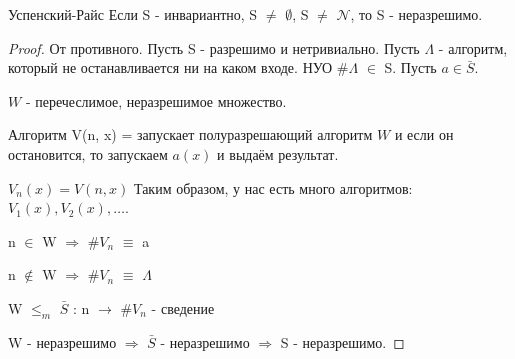 \begin{theorem}{Успенский-Райс}
	Если S - инвариантно, S $\ne$  $\emptyset$, S $\ne$ $\mathcal{N}$, то S - неразрешимо.	
\end{theorem}
\begin{proof}
	От противного. Пусть S - разрешимо  и нетривиально. Пусть $\Lambda$ - алгоритм, который не останавливается ни на каком входе.
	НУО \#$\Lambda$ $\in$ S. Пусть $a \in \bar{S}$.

	$W$ - перечеслимое, неразрешимое множество.

	Алгоритм V(n, x) = запускает полуразрешающий алгоритм $W$ и если он остановится, то запускаем $a(x)$ и выдаём результат.

	$V_n(x) = V(n, x)$ Таким образом, у нас есть много алгоритмов: $V_1(x), V_2(x), \dots$.

	n $\in$ W $\Rightarrow$ \#$V_n$ $\equiv$ a

	n $\notin$ W $\Rightarrow$ \#$V_n$ $\equiv$ $\Lambda$

	W $\le_m$ $\bar{S}$ : n $\longrightarrow$ \#$V_n$ - сведение

	W - неразрешимо $\Rightarrow$ $\bar{S}$ - неразрешимо $\Rightarrow$  S - неразрешимо.
\end{proof}